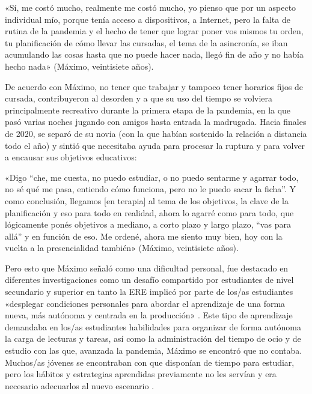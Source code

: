 \begin{refsection}
\begin{gbcita}
«Sí, me costó mucho, realmente me costó mucho, yo pienso que por un aspecto individual mío, porque tenía acceso a dispositivos, a Internet, pero la falta de rutina de la pandemia y el hecho de tener que lograr poner vos mismos tu orden, tu planificación de cómo llevar las cursadas, el tema de la asincronía, se iban acumulando las cosas hasta que no puede hacer nada, llegó fin de año y no había hecho nada» (Máximo, veintisiete años).

\end{gbcita}

De acuerdo con Máximo, no tener que trabajar y tampoco tener horarios fijos de cursada, contribuyeron al desorden y a que su uso del tiempo se volviera principalmente recreativo durante la primera etapa de la pandemia, en la que pasó varias noches jugando con amigos hasta entrada la madrugada. Hacia finales de 2020, se separó de su novia (con la que habían sostenido la relación a distancia todo el año) y sintió que necesitaba ayuda para procesar la ruptura y para volver a encausar sus objetivos educativos:


\begin{gbcita}
«Digo “che, me cuesta, no puedo estudiar, o no puedo sentarme y agarrar todo, no sé qué me pasa, entiendo cómo funciona, pero no le puedo sacar la ficha”. Y como conclusión, llegamos [en terapia] al tema de los objetivos, la clave de la planificación y eso para todo en realidad, ahora lo agarré como para todo, que lógicamente ponés objetivos a mediano, a corto plazo y largo plazo, “vas para allá” y en función de eso. Me ordené, ahora me siento muy bien, hoy con la vuelta a la presencialidad también» (Máximo, veintisiete años).

\end{gbcita}

Pero esto que Máximo señaló como una dificultad personal, fue destacado en diferentes investigaciones como un desafío compartido por estudiantes de nivel secundario y superior \protect\parencites{4237-SANTOSSHARPE2022}{4240-MORAN2021}{4244-KRICHESKY2021}[entre otros]{4245-LEMUS2024} en tanto la ERE implicó por parte de los/as estudiantes «desplegar condiciones personales para abordar el aprendizaje de una forma nueva, más autónoma y centrada en la producción» \protect\parencite[pág.~58]{4240-MORAN2021}. Este tipo de aprendizaje demandaba en los/as estudiantes habilidades para organizar de forma autónoma la carga de lecturas y tareas, así como la administración del tiempo de ocio y de estudio \protect\parencite{4244-KRICHESKY2021} con las que, avanzada la pandemia, Máximo se encontró que no contaba. Muchos/as jóvenes se encontraban con que disponían de tiempo para estudiar, pero los hábitos y estrategias aprendidas previamente no les servían y era necesario adecuarlos al nuevo escenario \protect\parencite{4237-SANTOSSHARPE2022}.


\end{refsection}
